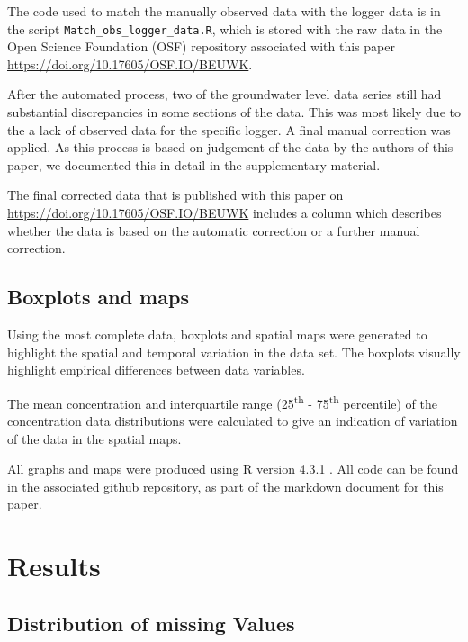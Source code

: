 \documentclass[, manuscript]{copernicus}
\begin{document}
The code used to match the manually observed data with the logger data
is in the script \texttt{Match\_obs\_logger\_data.R}, which is stored
with the raw data in the Open Science Foundation (OSF) repository
associated with this paper \url{https://doi.org/10.17605/OSF.IO/BEUWK}.

After the automated process, two of the groundwater level data series
still had substantial discrepancies in some sections of the data. This
was most likely due to the a lack of observed data for the specific
logger. A final manual correction was applied. As this process is based
on judgement of the data by the authors of this paper, we documented
this in detail in the supplementary material.

The final corrected data that is published with this paper on
\url{https://doi.org/10.17605/OSF.IO/BEUWK} includes a column which
describes whether the data is based on the automatic correction or a
further manual correction.

\subsection{Boxplots and maps}

Using the most complete data, boxplots and spatial maps were generated
to highlight the spatial and temporal variation in the data set. The
boxplots visually highlight empirical differences between data
variables.

The mean concentration and interquartile range (25\textsuperscript{th} -
75\textsuperscript{th} percentile) of the concentration data
distributions were calculated to give an indication of variation of the
data in the spatial maps.

All graphs and maps were produced using R version 4.3.1 \citep{R2023}.
All code can be found in the associated
\href{https://github.com/WillemVervoort/MuttamaDataPaper}{github
repository}, as part of the markdown document for this paper.

\section{Results}

\subsection{Distribution of missing Values}
\end{document}
